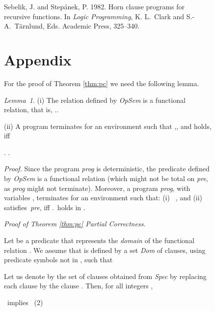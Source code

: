 \documentclass[english]{tlp}
\newcommand{\eop}{\hfill}
\begin{document}
\begin{figure}[ht]
\begin{flushleft}
\begin{minipage}{124mm}
\begin{thebibliography}{}
{\sc Sebelik, J.} {\sc and} {\sc Step{\'{a}}nek, P.} 1982.
\newblock Horn clause programs for recursive functions.
\newblock In {\em Logic Programming},
  {K. L.~Clark} {and} {S.-A.~T{\"a}rnlund}, Eds. 
  Academic Press, 325--340.



\end{thebibliography}

\newpage

\section*{Appendix}


For the proof of Theorem \ref{thm:pc} we need the following lemma.

\medskip
\noindent
{\it Lemma~1}. (i) The relation  defined by \textit{OpSem} is a functional relation, that is, 
..

\noindent
(ii) A program
 terminates for an environment  such that
\mbox{},, 
and  holds, iff

. .

\medskip

\noindent
{\it Proof.} 
Since the program \textit{prog}  is deterministic, 
the predicate  defined by \textit{OpSem} is 
a functional relation (which might not be total on \textit{pre}, as 
\textit{prog} might not terminate).
Moreover, a program \textit{prog}, with variables ,
terminates for an environment  such that:
(i)~  ,
and (ii)~  satisfies~\textit{pre},
iff  .\, holds in 
. \hfill\eop

\medskip

\noindent
{\it Proof of Theorem \ref{thm:pc} Partial Correctness.}

\noindent
Let  be  a predicate that
represents the {\it domain} of the functional relation .
We assume that    is defined by
a set \textit{Dom} of clauses, using predicate symbols not in , such that 

 \hfill 

\hspace{20mm} 

\noindent
Let us denote by  the set of clauses obtained from 
\textit{Spec} by replacing each clause  
by the clause .
Then,  for all integers ,

\smallskip

 \ implies \   \hfill (2)

\smallskip


\end{minipage}
\end{flushleft}
\end{figure}
\end{document}
